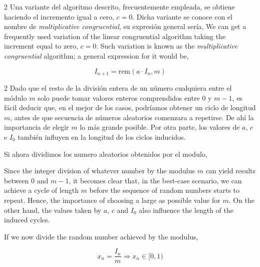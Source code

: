 \begin{paracol}{2}
Una variante del algoritmo descrito, frecuentemente empleada, se obtiene haciendo el incremento igual a cero, $c=0$. Dicha variante se conoce con el nombre de \emph{multiplicative congruential}, su expresión general sería,
\switchcolumn
We can get a frequently used variation of the linear congruential algorithm taking the increment equal to zero, $c=0$. Such variation is known as the \emph{multiplicative congruential} algorithm; a general expression for it would be, 
\end{paracol}
\begin{equation*}
I_{n+1}=\text{rem}(a\cdot I_n, m)
\end{equation*}
\begin{paracol}{2}
Dado que el resto de la división entera de un número cualquiera entre el módulo $m$ solo puede tomar valores enteros comprendidos entre $0$ y $m-1$, es fácil deducir que, en el mejor de los casos, podríamos obtener un ciclo de longitud $m$, antes de que secuencia de números aleatorios comenzara a repetirse. De ahí la importancia de elegir $m$ lo más grande posible. Por otra parte, los valores de $a$, $c$ e $I_0$ también influyen en la longitud de los ciclos inducidos.

Si ahora dividimos los numero aleatorios obtenidos por el modulo,  
\switchcolumn


Since the integer division of whatever number by the modulus $m$ can yield results between $0$ and $m-1$, it becomes clear that, in the best-case scenario, we can achieve a cycle of length $m$ before the sequence of random numbers starts to repeat. Hence, the importance of choosing a large as possible value for $m$. On the other hand, the values taken by $a$, $c$ and $I_0$ also influence the length of the induced cycles.

If we now divide the random number achieved by the modulus,
\end{paracol}
\begin{equation*}
x_n=\frac{I_n}{m} \Rightarrow x_n \in [0,1)
\end{equation*}

